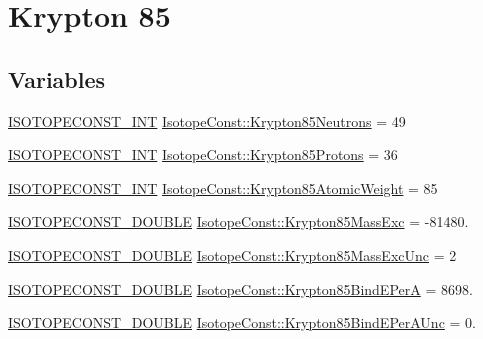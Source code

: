 \hypertarget{group___isotope_const-_krypton-_kr85}{}\section{Krypton 85}
\label{group___isotope_const-_krypton-_kr85}
\subsection*{Variables}
\begin{DoxyCompactItemize}
\item 
\mbox{\hyperlink{group___isotope_const-_macros_ga5f18360b3e99483a35c32d789e62621c}{I\+S\+O\+T\+O\+P\+E\+C\+O\+N\+S\+T\+\_\+\+I\+NT}} \mbox{\hyperlink{group___isotope_const-_krypton-_kr85_ga031921d39d518da90486120f21ae9b83}{Isotope\+Const\+::\+Krypton85\+Neutrons}} = 49
\item 
\mbox{\hyperlink{group___isotope_const-_macros_ga5f18360b3e99483a35c32d789e62621c}{I\+S\+O\+T\+O\+P\+E\+C\+O\+N\+S\+T\+\_\+\+I\+NT}} \mbox{\hyperlink{group___isotope_const-_krypton-_kr85_ga2e9ef6b4bf318b1a42db2a2d078e0736}{Isotope\+Const\+::\+Krypton85\+Protons}} = 36
\item 
\mbox{\hyperlink{group___isotope_const-_macros_ga5f18360b3e99483a35c32d789e62621c}{I\+S\+O\+T\+O\+P\+E\+C\+O\+N\+S\+T\+\_\+\+I\+NT}} \mbox{\hyperlink{group___isotope_const-_krypton-_kr85_gae6663a63560d23a6ca4edb2201bffb1c}{Isotope\+Const\+::\+Krypton85\+Atomic\+Weight}} = 85
\item 
\mbox{\hyperlink{group___isotope_const-_macros_ga8f45a7272ce02c0b4c65c44636ed719a}{I\+S\+O\+T\+O\+P\+E\+C\+O\+N\+S\+T\+\_\+\+D\+O\+U\+B\+LE}} \mbox{\hyperlink{group___isotope_const-_krypton-_kr85_gae6af21f1dba80f25f29b5e9a6067912d}{Isotope\+Const\+::\+Krypton85\+Mass\+Exc}} = -\/81480.
\item 
\mbox{\hyperlink{group___isotope_const-_macros_ga8f45a7272ce02c0b4c65c44636ed719a}{I\+S\+O\+T\+O\+P\+E\+C\+O\+N\+S\+T\+\_\+\+D\+O\+U\+B\+LE}} \mbox{\hyperlink{group___isotope_const-_krypton-_kr85_ga1ca32196cc8be4d9471af58053d85654}{Isotope\+Const\+::\+Krypton85\+Mass\+Exc\+Unc}} = 2
\item 
\mbox{\hyperlink{group___isotope_const-_macros_ga8f45a7272ce02c0b4c65c44636ed719a}{I\+S\+O\+T\+O\+P\+E\+C\+O\+N\+S\+T\+\_\+\+D\+O\+U\+B\+LE}} \mbox{\hyperlink{group___isotope_const-_krypton-_kr85_ga6679730542fb67356a02a7c850509b86}{Isotope\+Const\+::\+Krypton85\+Bind\+E\+PerA}} = 8698.
\item 
\mbox{\hyperlink{group___isotope_const-_macros_ga8f45a7272ce02c0b4c65c44636ed719a}{I\+S\+O\+T\+O\+P\+E\+C\+O\+N\+S\+T\+\_\+\+D\+O\+U\+B\+LE}} \mbox{\hyperlink{group___isotope_const-_krypton-_kr85_gac3555ccc511266c799a1f49c39cdf40f}{Isotope\+Const\+::\+Krypton85\+Bind\+E\+Per\+A\+Unc}} = 0.

\end{DoxyCompactItemize}

